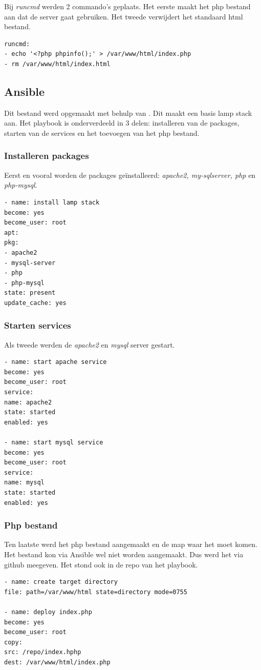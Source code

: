 Bij \textit{runcmd} werden 2 commando's geplaats. Het eerste maakt het php bestand aan dat de server gaat gebruiken. Het tweede verwijdert het standaard html bestand.
\begin{lstlisting}[basicstyle=\small]
runcmd:
- echo '<?php phpinfo();' > /var/www/html/index.php
- rm /var/www/html/index.html
\end{lstlisting}


\subsection{Ansible}
Dit bestand werd opgemaakt met behulp van \autocite{bekker}. Dit maakt een basis lamp stack aan. Het playbook is onderverdeeld in 3 delen: installeren van de packages, starten van de services en het  toevoegen van het php bestand.

\subsubsection{Installeren packages}
Eerst en vooral worden de packages geïnstalleerd: \textit{apache2, my-sqlserver, php} en \textit{php-mysql}.
\begin{lstlisting}[basicstyle=\small]
- name: install lamp stack
become: yes
become_user: root
apt:
pkg:
- apache2
- mysql-server
- php
- php-mysql
state: present
update_cache: yes
\end{lstlisting}

\subsubsection{Starten services}
Als tweede werden de \textit{apache2} en \textit{mysql} server gestart. 
\begin{lstlisting}[basicstyle=\small]
- name: start apache service
become: yes
become_user: root
service:
name: apache2
state: started
enabled: yes

- name: start mysql service
become: yes
become_user: root
service:
name: mysql
state: started
enabled: yes
\end{lstlisting}

\subsubsection{Php bestand}
Ten laatste werd het php bestand aangemaakt en de map waar het moet komen. Het bestand kon via Ansible wel niet worden aangemaakt. Dus werd het via github meegeven. Het stond ook in de repo van het playbook.
\begin{lstlisting}[basicstyle=\small]
- name: create target directory
file: path=/var/www/html state=directory mode=0755

- name: deploy index.php
become: yes
become_user: root
copy:
src: /repo/index.hphp
dest: /var/www/html/index.php
\end{lstlisting}

